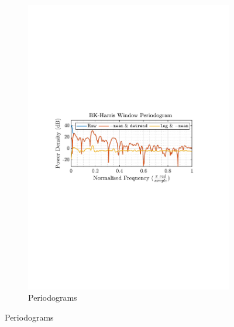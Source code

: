 \documentclass[12pt]{article}
\begin{document}
\begin{figure}[H]
\begin{subfigure}{0.49\textwidth}
			\includegraphics[trim={2.2cm 11.2cm 3.15cm  11.2cm}, clip, width=\textwidth]{../MATLAB/figures/q1_2a_fig02.pdf} 
			\captionsetup{justification=centering}
			\caption{Periodograms}
		\end{subfigure}
		\label{fig: 1-2a}
	\end{figure}
\end{document}

